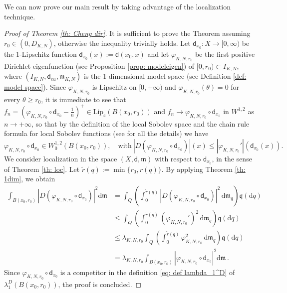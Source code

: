 \documentclass[12pt]{article}
\newcommand{\dd}{\mathrm{d}}
\newcommand{\Lip}{\mathrm{Lip}}
\newcommand{\mm}{\mathfrak m}
\newcommand{\di}{\mathsf{d}}
\theoremstyle{plain}
\theoremstyle{definition}
\begin{document}
We can now prove our main result by taking advantage of the localization technique.
\begin{proof}[Proof of Theorem \ref{th: Cheng dir}]
It is sufficient to prove the Theorem assuming $r_0\in (0,D_{K,N})$, otherwise the inequality trivially holds. 
Let $\mathsf{d}_{x_0}:X\to [0,\infty)$ be the $1$-Lipschitz function $\di_{x_0}(x):=\di(x_0,x)$ and let $\varphi_{K,N,r_0}$ be the first positive Dirichlet eigenfunction (see Proposition \ref{prop: modeleigen}) of $[0,r_0)\subset I_{K,N}$, where $(I_{K,N},\di_{eu},\mm_{K,N})$ is the 1-dimensional model space (see Definition \ref{def: model space}). Since $\varphi_{K,N,r_0}$ is Lipschitz on $[0,+\infty)$ and $\varphi_{K,N,r_0}(\theta)=0$ for every $\theta\ge r_0$, it is immediate to see that $f_n=(\varphi_{K,N,r_0}\circ \di_{x_0}-\frac{1}{n})^{+}\in \Lip_{\textsf{c}}(B(x_0,r_0))$ and $f_n\to \varphi_{K,N,r_0}\circ \di_{x_0}$ in $W^{1,2}$ as $n\to +\infty$, so that by the definition of the local Sobolev space and the chain rule formula for local Sobolev functions (see \cite{Gigli} for all the details) we have 
\begin{equation}\label{eq:varphi'leqD}
\varphi_{K,N,r_0}\circ \di_{x_0}\in W^{1,2}_0(B(x_0,r_0)), \quad \textrm{with} \ |D(\varphi_{K,N,r_0}\circ \di_{x_0})|(x)\le |\varphi_{K,N,r_0}'|(\di_{x_0}(x)).
\end{equation}
 We consider localization in the space $(X,\di,\mm)$ with respect to $\di_{x_0}$, in the sense of Theorem \ref{th: loc}. Let $\tilde{r}(q):=\min\{r_0,r(q)\}$. By applying Theorem \ref{th: 1dim}, we obtain
\begin{equation}\label{eq: dismain Ray}
\begin{aligned}
\int_{B(x_0,r_0)} |D(\varphi_{K,N,r_0}\circ \di_{x_0})|^2\dd \mm& = \int_Q\left(\int_0^{\tilde{r}(q)} |D(\varphi_{K,N,r_0}\circ \di_{x_0})|^2\,\dd \mm_{q}\right)\mathfrak{q}(\dd q)\\
&\leq \int_Q\left(\int_0^{\tilde{r}(q)} (\varphi_{K,N,r_0}')^2\,\dd \mm_{q}\right)\mathfrak{q}(\dd q)\\
&\le \lambda_{K,N,r_0} \int_Q\left(\int_0^{\tilde{r}(q)}\varphi_{K,N,r_0}^2\,\dd \mm_{q}\right)\mathfrak{q}(\dd q)\\
&=\lambda_{K,N,r_0}\int_{B(x_0,r_0)}|\varphi_{K,N,r_0}\circ \di_{x_0}|^2\dd \mm\,.
\end{aligned}
\end{equation}
Since $\varphi_{K,N,r_0}\circ \di_{x_0}$ is a competitor in the definition \eqref{eq: def lambda_1^D} of $\lambda_1^D(B(x_0,r_0))$, the proof is concluded.
\end{proof}
\end{document}
